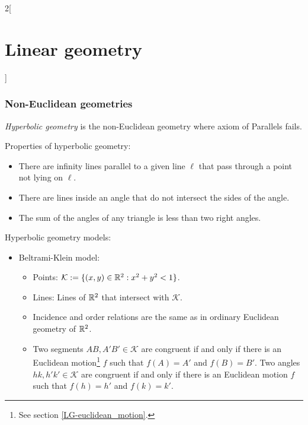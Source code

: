 \documentclass[../../../main.tex]{subfiles}
\begin{document}
\begin{multicols}{2}[\section{Linear geometry}]
    \subsubsection*{Non-Euclidean geometries}
    \begin{definition}
        \textit{Hyperbolic geometry} is the non-Euclidean geometry where axiom of Parallels fails.
    \end{definition}
    \begin{prop}
        Properties of hyperbolic geometry:
        \begin{itemize}
            \item There are infinity lines parallel to a given line $\ell$ that pass through a point not lying on $\ell$.
            \item There are lines inside an angle that do not intersect the sides of the angle.
            \item The sum of the angles of any triangle is less than two right angles.
        \end{itemize}
    \end{prop}
    \begin{definition}
        Hyperbolic geometry models:
        \begin{itemize}
            \item Beltrami-Klein model:
                  \begin{itemize}
                      \item Points: $\mathcal{K}:=\{(x,y)\in\mathbb{R}^2:x^2+y^2<1\}$.
                      \item Lines: Lines of $\mathbb{R}^2$ that intersect with $\mathcal{K}$.
                      \item Incidence and order relations are the same as in ordinary Euclidean geometry of $\mathbb{R}^2$.
                      \item Two segments $AB,A'B'\in\mathcal{K}$ are congruent if and only if there is an Euclidean motion\footnote{See section \ref{LG-euclidean_motion}.} $f$ such that $f(A)=A'$ and $f(B)=B'$. Two angles $hk,h'k'\in\mathcal{K}$ are congruent if and only if there is an Euclidean motion $f$ such that $f(h)=h'$ and $f(k)=k'$.
                  \end{itemize}
                  \begin{center}
                      \begin{minipage}{\linewidth}
                          \centering
                          

\end{minipage}
\end{center}
\end{itemize}
\end{definition}
\end{multicols}
\end{document}

